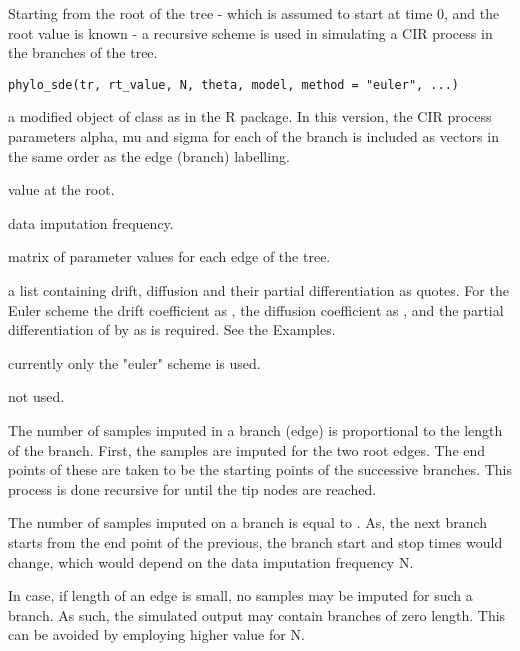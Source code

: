 \documentclass[letterpaper]{book}
\begin{document}
%
\begin{Description}\relax
Starting from the root of the tree - which is assumed to start at
time 0, and the root value is known - a recursive scheme is used in
simulating a CIR process in the branches of the tree.
\end{Description}
%
\begin{Usage}
\begin{verbatim}
phylo_sde(tr, rt_value, N, theta, model, method = "euler", ...)
\end{verbatim}
\end{Usage}
%
\begin{Arguments}
\begin{ldescription}
\item[\code{tr}] a modified object of class  as in the
 R package. In this version, the CIR process
parameters alpha, mu and sigma for each of the branch
is included as vectors in the same order
as the edge (branch) labelling.

\item[\code{rt\_value}] value at the root.

\item[\code{N}] data imputation frequency.

\item[\code{theta}] matrix of parameter values for each edge of the tree.

\item[\code{model}] a list containing drift, diffusion
and their partial differentiation as quotes. For the Euler scheme
the drift coefficient as , the diffusion coefficient as
, and the partial differentiation of
 by  as  is required.
See the Examples.

\item[\code{method}] currently only the "euler" scheme is used.

\item[\code{...}] not used.
\end{ldescription}
\end{Arguments}
%
\begin{Details}\relax
The number of samples imputed in a branch (edge) is proportional to the length
of the branch. First, the samples are imputed for the two root edges.
The end points of these are taken to be the starting points of
the successive branches. This process is done recursive for until
the tip nodes are reached.

The number of samples imputed on a branch is equal to
.
As, the next branch starts from the end point of the previous,
the branch start and stop times would change,
which would depend on the data imputation frequency N.

In case, if length of an edge is small, no samples may be imputed for
such a branch. As such, the simulated output may contain branches
of zero length. This can be avoided by employing higher value for N.
\end{Details}
\end{document}
